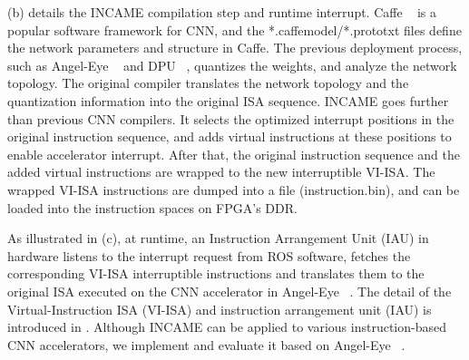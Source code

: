 (b) details the INCAME compilation step and runtime interrupt. Caffe  ~\cite{jia2014caffe} is a popular software framework for CNN, and the *.caffemodel/*.prototxt files define the network parameters and structure in Caffe. The previous deployment process, such as Angel-Eye  ~\cite{guo2017angel} and DPU ~\cite{dpu}, quantizes the weights, and analyze the network topology. The original compiler translates the network topology and the quantization information into the original ISA sequence. INCAME goes further than previous CNN compilers. It selects the optimized interrupt positions in the original instruction sequence, and adds virtual instructions at these positions to enable accelerator interrupt. After that, the original instruction sequence and the added virtual instructions are wrapped to the new interruptible VI-ISA. The wrapped VI-ISA instructions are dumped into a file (instruction.bin), and can be loaded into the instruction spaces on FPGA's DDR.


As illustrated in (c), at runtime, an Instruction Arrangement Unit (IAU) in hardware listens to the interrupt request from ROS software, fetches the corresponding VI-ISA interruptible instructions and translates them to the original ISA executed on the CNN accelerator in Angel-Eye  ~\cite{guo2017angel}. 
The detail of the Virtual-Instruction ISA (VI-ISA) and instruction arrangement unit (IAU) is introduced in . Although INCAME can be applied to various instruction-based CNN accelerators, we implement and evaluate it based on Angel-Eye  ~\cite{guo2017angel}.

